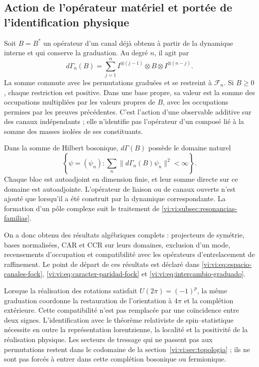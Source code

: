 \subsection{Action de l’opérateur matériel et portée de l’identification physique}
\label{vi:vi:subsec:fock-alcance}

Soit \(B=B^*\) un opérateur d’un canal déjà obtenu à partir de la
dynamique interne et qui conserve la graduation. Au degré \(n\),
il agit par
\[
 d\Gamma_n(B)=\sum_{j=1}^n
 I^{\otimes(j-1)}\otimes B\otimes I^{\otimes(n-j)}.
\]
La somme commute avec les permutations graduées et se restreint
à \(\mathcal F_n\). Si \(B\ge0\), chaque restriction est positive.
Dans une base propre, sa valeur est la somme des occupations
multipliées par les valeurs propres de \(B\), avec les occupations
permises par les preuves précédentes. C’est l’action
d’une observable additive sur des canaux indépendants ;
elle n’identifie pas l’opérateur d’un composé lié à la
somme des masses isolées de ses constituants.

Dans la somme de Hilbert bosonique, \(d\Gamma(B)\) possède le
domaine naturel
\[
 \left\{\psi=(\psi_n):
 \sum_n\|d\Gamma_n(B)\psi_n\|^2<\infty\right\}.
\]
Chaque bloc est autoadjoint en dimension finie, et leur somme
directe sur ce domaine est autoadjointe. L’opérateur de liaison
ou de canaux ouverts n’est ajouté que lorsqu’il a été construit
par la dynamique correspondante. La formation d’un pôle
complexe suit le traitement de
\ref{vi:vi:subsec:resonancias-familias}.

On a donc obtenu des résultats algébriques complets :
projecteurs de symétrie, bases normalisées, CAR et CCR sur
leurs domaines, exclusion d’un mode, recensements d’occupation et
compatibilité avec les opérateurs d’entrelacement de raffinement. Le point
de départ de ces résultats est déclaré dans
\eqref{vi:vi:eq:espacio-canales-fock},
\eqref{vi:vi:eq:caracter-paridad-fock} et
\eqref{vi:vi:eq:intercambio-graduado}.

Lorsque la réalisation des rotations satisfait
\(U(2\pi)=(-1)^p\), la même graduation coordonne la
restauration de l’orientation à \(4\pi\) et la complétion
extérieure. Cette compatibilité n’est pas remplacée par une
coïncidence entre deux signes. L’identification avec le
théorème relativiste de spin--statistique nécessite en outre
la représentation lorentzienne, la localité et la positivité
de la réalisation physique. Les secteurs de tressage qui ne
passent pas aux permutations restent dans le codomaine de
la section~\ref{vi:vi:sec:topologia} ; ils ne sont pas forcés à entrer
dans cette complétion bosonique ou fermionique.

